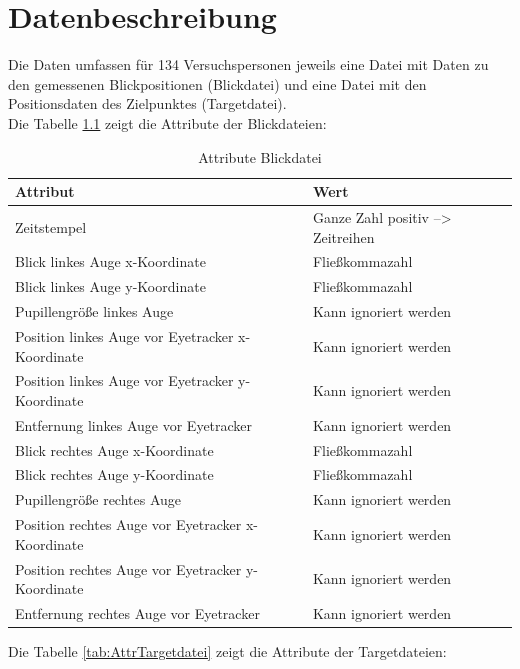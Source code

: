 \chapter{Datenbeschreibung}
Die Daten umfassen f\"ur 134 Versuchspersonen jeweils eine Datei mit Daten zu den gemessenen Blickpositionen (Blickdatei) und eine Datei mit den Positionsdaten des Zielpunktes (Targetdatei).\\
Die Tabelle \ref{tab:AttrBlickdatei} zeigt die Attribute der Blickdateien:

\begin{table}[H]
	\caption{\label{tab:AttrBlickdatei}Attribute Blickdatei}
	
	
	\noindent \centering{}
	\bgroup
	\def\arraystretch{2}  %
	\begin{tabular}{|l|l|}
		\hline 
		\textbf{Attribut} & \textbf{Wert}\\
		\hline \hline
		Zeitstempel & Ganze Zahl positiv --> Zeitreihen\\
		\hline
		Blick linkes Auge x-Koordinate & Flie\ss{}kommazahl \\
		\hline
		Blick linkes Auge y-Koordinate & Flie\ss{}kommazahl \\
		\hline
		Pupillengr\"o\ss{}e linkes Auge & Kann ignoriert werden \\
		\hline
		Position linkes Auge vor Eyetracker x-Koordinate & Kann ignoriert werden \\
		\hline
		Position linkes Auge vor Eyetracker y-Koordinate & Kann ignoriert werden \\
		\hline
		Entfernung linkes Auge vor Eyetracker & Kann ignoriert werden \\
		\hline
		Blick rechtes Auge x-Koordinate & Flie\ss{}kommazahl \\
		\hline
		Blick rechtes Auge y-Koordinate & Flie\ss{}kommazahl \\
		\hline
		Pupillengr\"o\ss{}e rechtes Auge & Kann ignoriert werden \\
		\hline
		Position rechtes Auge vor Eyetracker x-Koordinate & Kann ignoriert werden \\
		\hline
		Position rechtes Auge vor Eyetracker y-Koordinate & Kann ignoriert werden \\
		\hline
		Entfernung rechtes Auge vor Eyetracker & Kann ignoriert werden \\
		\hline
	\end{tabular}
	\egroup
\end{table}

Die Tabelle \ref{tab:AttrTargetdatei} zeigt die Attribute der Targetdateien:

